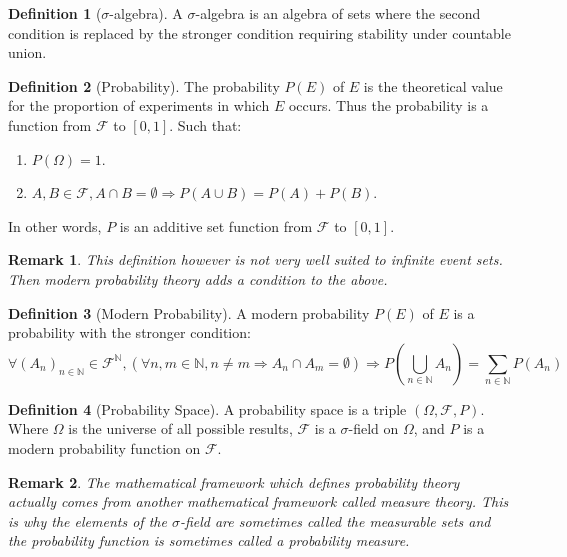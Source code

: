 \documentclass[10pt,a4paper]{book}
\newtheorem*{remark}{Remark}
\theoremstyle{definition}
\newtheorem{definition}{Definition}[section]
\begin{document}
\begin{definition}[$\sigma$-algebra]
A $\sigma$-algebra is an algebra of sets where the second condition is replaced by the stronger condition requiring stability under countable union.
\end{definition}

\begin{definition}[Probability]
The probability $P(E)$ of $E$ is the theoretical value for the proportion of experiments in which $E$ occurs. Thus the probability is a function from $\mathcal{F}$ to $[0,1]$. Such that:
\begin{enumerate}
\item $P(\Omega) = 1$.
\item $A, B \in \mathcal{F}, A \cap B = \emptyset \Rightarrow P(A \cup B) = P(A) + P(B)$.
\end{enumerate}
In other words, $P$ is an additive set function from $\mathcal{F}$ to $[0,1]$.
\end{definition}

\begin{remark}
This definition however is not very well suited to infinite event sets. Then modern probability theory adds a condition to the above.
\end{remark}

\begin{definition}[Modern Probability]
A modern probability $P(E)$ of $E$ is a probability with the stronger condition:
\[
\forall (A_n)_{n \in \mathbb{N}} \in \mathcal{F}^\mathbb{N}, \left(\forall n, m \in \mathbb{N}, n \neq m \Rightarrow A_n \cap A_m = \emptyset\right) \Rightarrow P\left(\bigcup_{n \in \mathbb{N}} A_n \right) = \sum_{n \in \mathbb{N}} P(A_n)
\]
\end{definition}

\begin{definition}[Probability Space]
A probability space is a triple $(\Omega, \mathcal{F}, P)$. Where $\Omega$ is the universe of all possible results, $\mathcal{F}$ is a $\sigma$-field on $\Omega$, and $P$ is a modern probability function on $\mathcal{F}$.
\end{definition}

\begin{remark}
The mathematical framework which defines probability theory actually comes from another mathematical framework called measure theory. This is why the elements of the $\sigma$-field are sometimes called the measurable sets and the probability function is sometimes called a probability measure.
\end{remark}
\end{document}
